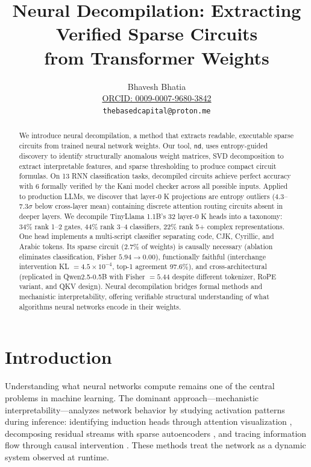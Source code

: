\documentclass[11pt]{article}
\title{Neural Decompilation: Extracting Verified Sparse Circuits\\from Transformer Weights}
\author{
  Bhavesh Bhatia\\
  \href{https://orcid.org/0009-0007-9680-3842}{ORCID: 0009-0007-9680-3842}\\
  \texttt{thebasedcapital@proton.me}
}
\date{}
\begin{document}
\maketitle

\begin{abstract}
We introduce neural decompilation, a method that extracts readable, executable sparse circuits from trained neural network weights. Our tool, \texttt{nd}, uses entropy-guided discovery to identify structurally anomalous weight matrices, SVD decomposition to extract interpretable features, and sparse thresholding to produce compact circuit formulas. On 13 RNN classification tasks, decompiled circuits achieve perfect accuracy with 6 formally verified by the Kani model checker across all possible inputs. Applied to production LLMs, we discover that layer-0 K projections are entropy outliers ($4.3$--$7.3\sigma$ below cross-layer mean) containing discrete attention routing circuits absent in deeper layers. We decompile TinyLlama 1.1B's 32 layer-0 K heads into a taxonomy: 34\% rank 1--2 gates, 44\% rank 3--4 classifiers, 22\% rank 5+ complex representations. One head implements a multi-script classifier separating code, CJK, Cyrillic, and Arabic tokens. Its sparse circuit (2.7\% of weights) is causally necessary (ablation eliminates classification, Fisher $5.94 \rightarrow 0.00$), functionally faithful (interchange intervention KL $= 4.5 \times 10^{-4}$, top-1 agreement 97.6\%), and cross-architectural (replicated in Qwen2.5-0.5B with Fisher $= 5.44$ despite different tokenizer, RoPE variant, and QKV design). Neural decompilation bridges formal methods and mechanistic interpretability, offering verifiable structural understanding of what algorithms neural networks encode in their weights.
\end{abstract}

\section{Introduction}

Understanding what neural networks compute remains one of the central problems in machine learning. The dominant approach---mechanistic interpretability---analyzes network behavior by studying activation patterns during inference: identifying induction heads through attention visualization \cite{olsson2022}, decomposing residual streams with sparse autoencoders \cite{cunningham2024,bricken2023}, and tracing information flow through causal intervention \cite{conmy2023}. These methods treat the network as a dynamic system observed at runtime.
\end{document}
